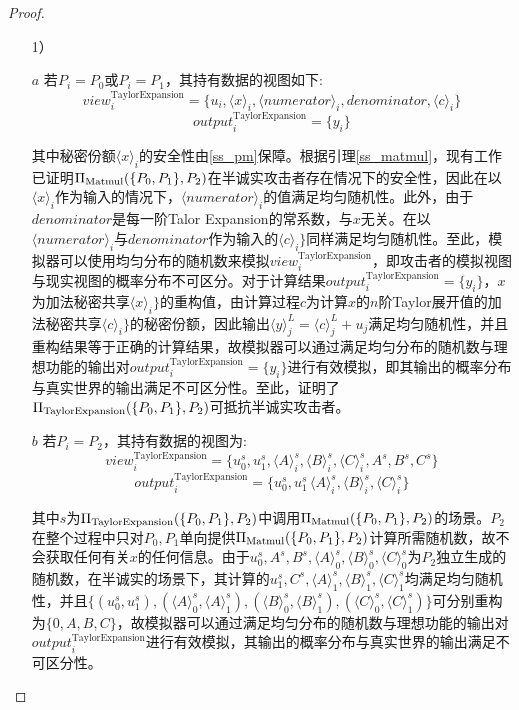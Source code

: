 \begin{proof}
	\begin{itemize}
		\item [1）]
		
		\item [$a$]
		若$P_i=P_0$或$P_i=P_1$，其持有数据的视图如下:
		$$view_i^{\text{TaylorExpansion}}=\{u_i, \langle x\rangle_i,\langle numerator\rangle_i, denominator, \langle c\rangle_i\}$$
		$$output_i^{\text{TaylorExpansion}}=\{y_i\}$$
		
		其中秘密份额$\langle x\rangle_i$的安全性由\ref{ss_pm}保障。根据引理\ref{ss_matmul}，现有工作已证明$\Pi_{\rm Matmul}(\{P_0, P_1\}, P_2)$在半诚实攻击者存在情况下的安全性，因此在以$\langle x\rangle_i$作为输入的情况下，$\langle numerator\rangle_i$的值满足均匀随机性。此外，由于$denominator$是每一阶Talor Expansion的常系数，与$x$无关。在以$\langle numerator\rangle_i$与$denominator$作为输入的$\langle c\rangle_i\}$同样满足均匀随机性。至此，模拟器可以使用均匀分布的随机数来模拟$view_i^{\text{TaylorExpansion}}$，即攻击者的模拟视图与现实视图的概率分布不可区分。对于计算结果$output_i^{\text{TaylorExpansion}}=\{y_i\}$，$x$为加法秘密共享$\langle x\rangle_i\}$的重构值，由计算过程$c$为计算$x$的$n$阶Taylor展开值的加法秘密共享$\langle c\rangle_i\}$的秘密份额，因此输出$\langle y\rangle_j^L = \langle c\rangle_j^L + u_j$满足均匀随机性，并且重构结果等于正确的计算结果，故模拟器可以通过满足均匀分布的随机数与理想功能的输出对$output_i^{\text{TaylorExpansion}}=\{y_i\}$进行有效模拟，即其输出的概率分布与真实世界的输出满足不可区分性。至此，证明了$\Pi_{\rm TaylorExpansion}(\{P_0, P_1\}, P_2)$可抵抗半诚实攻击者。
		
		\item [$b$]
		若$P_i=P_2$，其持有数据的视图为:
		$$view_i^{\text{TaylorExpansion}}=\{u_0^s, u_1^s, \langle A\rangle_i^s,\langle B\rangle_i^s,\langle C\rangle_i^s, A^s, B^s, C^s\}$$
		$$output_i^{\text{TaylorExpansion}}=\{u_0^s, u_1^s\, \langle A\rangle_i^s,\langle B\rangle_i^s,\langle C\rangle_i^s\}$$
	
		其中$s$为$\Pi_{\rm TaylorExpansion}(\{P_0, P_1\}, P_2)$中调用$\Pi_{\rm Matmul}(\{P_0, P_1\}, P_2)$的场景。$P_2$在整个过程中只对$P_0, P_1$单向提供$\Pi_{\rm Matmul}(\{P_0, P_1\}, P_2)$计算所需随机数，故不会获取任何有关$x$的任何信息。由于$u_0^s, A^s, B^s, \langle A\rangle_0^s,\langle B\rangle_0^s,\langle C\rangle_0^s$为$P_2$独立生成的随机数，在半诚实的场景下，其计算的$u_1^s, C^s, \langle A\rangle_1^s,\langle B\rangle_1^s,\langle C\rangle_1^s$均满足均匀随机性，并且$\{(u_0^s, u_1^s), (\langle A\rangle_0^s, \langle A\rangle_1^s), (\langle B\rangle_0^s, \langle B\rangle_1^s), (\langle C\rangle_0^s, \langle C\rangle_1^s)\}$可分别重构为$\{0, A, B, C\}$，故模拟器可以通过满足均匀分布的随机数与理想功能的输出对$output_i^{\text{TaylorExpansion}}$进行有效模拟，其输出的概率分布与真实世界的输出满足不可区分性。
		

\end{itemize}
\end{proof}
